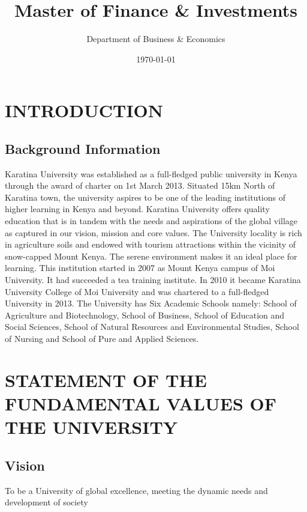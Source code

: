 \documentclass[16,a4paperpaper,]{article}
\title{Master of Finance \& Investments}
\author{Department of Business \& Economics}
\date{\today}
\begin{document}
\renewcommand{\contentsname}{Contents}

\renewcommand{\pagename}{Page}


\maketitle
\tableofcontents
{}
\clearpage

\section{INTRODUCTION}

\subsection{Background Information}

Karatina University was established as a full-fledged public university
in Kenya through the award of charter on 1st March 2013. Situated 15km
North of Karatina town, the university aspires to be one of the leading
institutions of higher learning in Kenya and beyond. Karatina University
offers quality education that is in tandem with the needs and
aspirations of the global village as captured in our vision, mission and
core values. The University locality is rich in agriculture soils and
endowed with tourism attractions within the vicinity of snow-capped
Mount Kenya. The serene environment makes it an ideal place for
learning. This institution started in 2007 as Mount Kenya campus of Moi
University. It had succeeded a tea training institute. In 2010 it became
Karatina University College of Moi University and was chartered to a
full-fledged University in 2013. The University has Six Academic Schools
namely: School of Agriculture and Biotechnology, School of Business,
School of Education and Social Sciences, School of Natural Resources and
Environmental Studies, School of Nursing and School of Pure and Applied
Sciences.

\section{STATEMENT OF THE FUNDAMENTAL VALUES OF THE UNIVERSITY}

\subsection{Vision}

To be a University of global excellence, meeting the dynamic needs and
development of society
\end{document}
